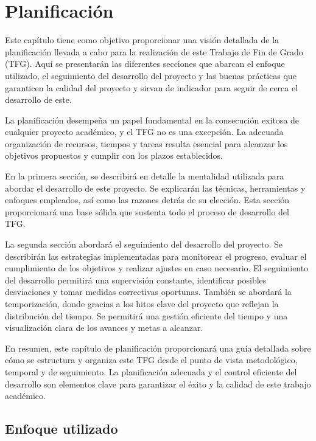 \chapter{Planificación}

Este capítulo tiene como objetivo proporcionar una visión detallada de la planificación llevada a cabo para la realización de este Trabajo de Fin de Grado (TFG). Aquí se presentarán las diferentes secciones que abarcan el enfoque utilizado, el seguimiento del desarrollo del proyecto y las buenas prácticas que garanticen la calidad del proyecto y sirvan de indicador para seguir de cerca el desarrollo de este.

La planificación desempeña un papel fundamental en la consecución exitosa de cualquier proyecto académico, y el TFG no es una excepción. La adecuada organización de recursos, tiempos y tareas resulta esencial para alcanzar los objetivos propuestos y cumplir con los plazos establecidos.

En la primera sección, se describirá en detalle la mentalidad utilizada para abordar el desarrollo de este proyecto. Se explicarán las técnicas, herramientas y enfoques empleados, así como las razones detrás de su elección. Esta sección proporcionará una base sólida que sustenta todo el proceso de desarrollo del TFG.

La segunda sección abordará el seguimiento del desarrollo del proyecto. Se describirán las estrategias implementadas para monitorear el progreso, evaluar el cumplimiento de los objetivos y realizar ajustes en caso necesario. El seguimiento del desarrollo permitirá una supervisión constante, identificar posibles desviaciones y tomar medidas correctivas oportunas. También se abordará la temporización, donde gracias a los hitos clave del proyecto que reflejan la distribución del tiempo. Se permitirá una gestión eficiente del tiempo y una visualización clara de los avances y metas a alcanzar.

En resumen, este capítulo de planificación proporcionará una guía detallada sobre cómo se estructura y organiza este TFG desde el punto de vista metodológico, temporal y de seguimiento. La planificación adecuada y el control eficiente del desarrollo son elementos clave para garantizar el éxito y la calidad de este trabajo académico.

\section{Enfoque utilizado}

